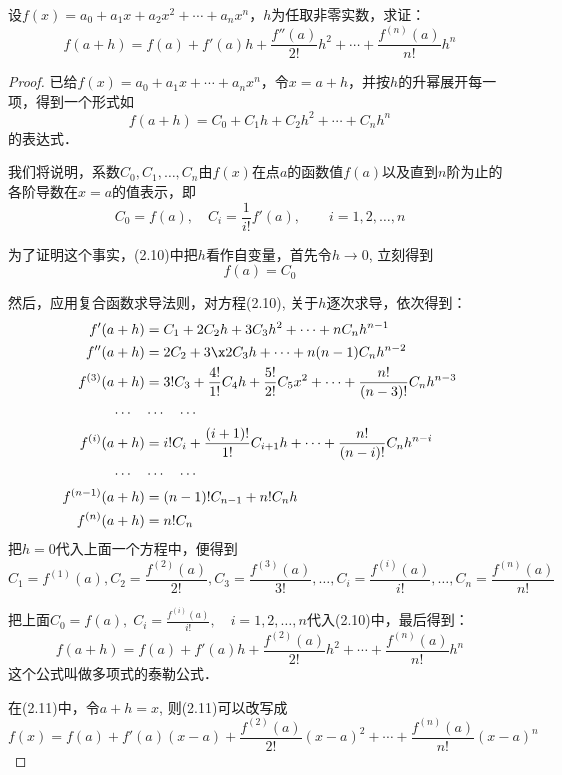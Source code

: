 \begin{example}
设$f(x)=a_0+a_1x+a_2x^2+\cdots+a_nx^n$，$h$为任取非零实数，求证：
\[f(a+h)=f(a)+f'(a)h+\frac{f''(a)}{2!}h^2+\cdots+\frac{f^{(n)}(a)}{n!}h^n\]
\end{example}


\begin{proof}
已给$f(x)=a_0+a_1x+\cdots+a_nx^n$，令$x=a+h$，并按$h$的升幂展开每一项，得到一个形式如
\begin{equation}
    f(a+h)=C_0+C_1 h+C_2 h^2+\cdots +C_n h^n
\end{equation}
的表达式．

我们将说明，系数$C_0,C_1,\ldots,C_n$由$f(x)$在点$a$的函数值$f(a)$以及直到$n$阶为止的各阶导数在$x=a$的值表示，即
\[C_0=f (a) ,\quad  C_i =\frac{1}{i!}f' (a) ,\qquad i=1, 2,\ldots ,n\]

为了证明这个事实，(2.10)中把$h$看作自变量，首先令$h\to 0$, 立刻得到
\[f (a) =C_0\]

然后，应用复合函数求导法则，对方程(2.10), 关于$h$逐次求导，依次得到：
\begin{align*}
f'(a+h)&=C_1+2C_2 h+3C_3h^2+\cdots +nC_nh^{n-1}\\
f''(a+h)&=2C_2+3\x 2C_3h+\cdots+n(n-1)C_nh^{n-2}\\
f^{(3)}(a+h)&=3!C_3+\frac{4!}{1!}C_4h+\frac{5!}{2!}C_5x^2+\cdots+\frac{n!}{(n-3)!}C_nh^{n-3}\\
\cdots\quad &\cdots\quad \cdots\\
f^{(i)}(a+h)&=i! C_i+\frac{(i+1)!}{1!}C_{i+1}h+\cdots+\frac{n!}{(n-i)!}C_nh^{n-i}\\
\cdots\quad &\cdots\quad \cdots\\
f^{(n-1)}(a+h)&=(n-1)!C_{n-1}+n!C_nh\\
f^{(n)}(a+h)&=n!C_n
\end{align*}
把$h=0$代入上面一个方程中，便得到
\[C_1=f^{(1)}(a),C_2=\frac{f^{(2)}(a)}{2!},C_3=\frac{f^{(3)}(a)}{3!},\ldots,C_i=\frac{f^{(i)}(a)}{i!},\ldots,C_n=\frac{f^{(n)}(a)}{n!}\]

把上面$C_0=f(a),\; C_i=\frac{f^{(i)}(a)}{i!},\quad i=1,2,\ldots,n$代入(2.10)中，最后得到：
\begin{equation}
    f(a+h)=f(a)+f'(a)h+\frac{f^{(2)}(a)}{2!}h^2+\cdots+\frac{f^{(n)}(a)}{n!}h^n
\end{equation}
这个公式叫做多项式的泰勒公式．

在(2.11)中，令$a+h=x$, 则(2.11)可以改写成
\[    f(x)=f(a)+f'(a)(x-a)+\frac{f^{(2)}(a)}{2!}(x-a)^2+\cdots+\frac{f^{(n)}(a)}{n!}(x-a)^n\]
\end{proof}


